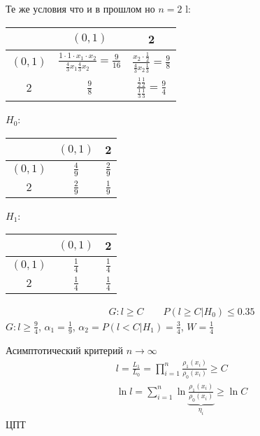 \documentclass{article}
\begin{document}
\begin{eg}
  Те же условия что и в прошлом но $n=2$
  l:
  \begin{center}
    \begin{tabular}{| c | c | c |}
      \hline
      & $(0,1)$ & 2 \\
      \hline 
      $(0,1)$ & $\frac{1\cdot 1 \cdot x_1 \cdot x_2}{\frac{4}{3}x_1\frac{4}{3}x_2}=\frac{9}{16}$ & $\frac{x_2 \cdot \frac{1}{2}}{\frac{4}{3}x_2 \frac{1}{3}}=\frac{9}{8}$ \\
      \hline 
      $2$ & $\frac{9}{8}$ & $\frac{\frac{1}{2}\frac{1}{2}}{\frac{1}{3}\frac{1}{3}}=\frac{9}{4}$ \\
      \hline 
    \end{tabular}
  \end{center}
  $H_0$:
  \begin{center}
    \begin{tabular}{| c | c | c |}
      \hline
      & $(0,1)$ & 2 \\
      \hline 
      $(0,1)$ & $\frac{4}{9}$& $\frac{2}{9}$ \\
      \hline 
      $2$ & $\frac{2}{9}$& $\frac{1}{9}$ \\
      \hline 
    \end{tabular}
  \end{center}
  $H_1$:
  \begin{center}
    \begin{tabular}{| c | c | c |}
      \hline
      & $(0,1)$ & 2 \\
      \hline 
      $(0,1)$ & $\frac{1}{4}$& $\frac{1}{4}$ \\
      \hline 
      $2$ & $\frac{1}{4}$& $\frac{1}{4}$ \\
      \hline 
    \end{tabular}
  \end{center}
  \begin{gather*}
    G:l \ge C \qquad P(l \ge C | H_0) \le 0.35
  \end{gather*}
  $G: l\ge \frac{9}{4}$, $\alpha_1=\frac{1}{9}$, $\alpha_2=P(l < C|H_1)=\frac{3}{4}$, $W=\frac{1}{4}$

  Асимптотический критерий $n\to\infty$
  \begin{gather*}
    l=\frac{L_1}{L_0}=\prod_{i=1}^{n}\frac{\rho_1(x_i)}{\rho_0(x_i)} \ge C \\ 
    \ln l = \sum_{i=1}^{n}\ln \underbrace{\frac{\rho_1(x_i)}{\rho_0(x_i)}}_{\eta_i} \ge \ln C
  \end{gather*}
  ЦПТ


\end{eg}
\end{document}
